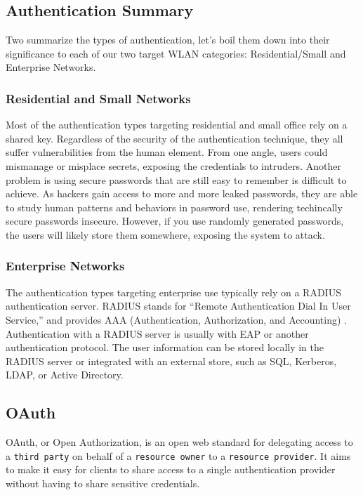 \subsection{Authentication Summary}
Two summarize the types of authentication, let's boil them down into their significance to each
of our two target WLAN categories: Residential/Small and Enterprise Networks.

\subsubsection{Residential and Small Networks}
Most of the authentication types targeting residential and small office rely on a shared key.
Regardless of the security of the authentication technique, they all suffer vulnerabilities from
the human element. From one angle, users could mismanage or misplace secrets, exposing the
credentials to intruders. Another problem is using secure passwords that are still easy to
remember is difficult to achieve. As hackers gain access to more and more leaked passwords, they
are able to study human patterns and behaviors in password use, rendering techincally secure
passwords insecure. However, if you use randomly generated passwords, the users will likely store
them somewhere, exposing the system to attack.

\subsubsection{Enterprise Networks}
The authentication types targeting enterprise use typically rely on a RADIUS authentication server.
RADIUS stands for ``Remote Authentication Dial In User Service,'' and provides AAA (Authentication,
Authorization, and Accounting) \cite{wiki:RADIUS}. Authentication with a RADIUS server is usually
with EAP or another authentication protocol. The user information can be stored locally in the
RADIUS server or integrated with an external store, such as SQL, Kerberos, LDAP, or Active
Directory.

\subsection{OAuth}
OAuth, or Open Authorization, is an open web standard for delegating access to a \texttt{third
party} on behalf of a \texttt{resource owner} to a \texttt{resource provider}. It aims to make it
easy for clients to share access to a single authentication provider without having to share
sensitive credentials.

